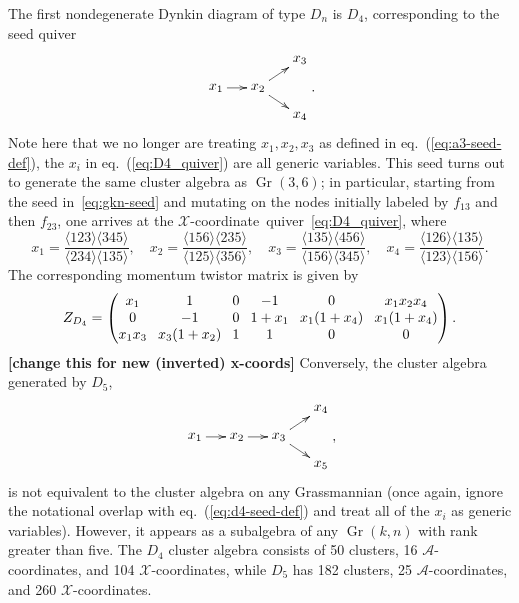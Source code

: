 \documentclass[11pt]{article}
\DeclareMathOperator{\Gr}{Gr}
\def\ket#1{\langle #1 \rangle}
\def\xcoord{$\mathcal{X}$-coordinate}
\def\xcoords{$\mathcal{X}$-coordinates}
\def\acoords{$\mathcal{A}$-coordinates}
\def\draftnote#1{{\bf [#1]}}
\begin{document}
The first nondegenerate Dynkin diagram of type $D_n$ is $D_4$, corresponding to the seed quiver
\begin{equation} \label{eq:D4_quiver}
    \begin{gathered}
    \begin{xy} 0;<1pt,0pt>:<0pt,-1pt>::
      (0,20) *+{x_1} ="1",
      (30,20) *+{x_2} ="2",
      (60,0) *+{x_3} ="3",
      (60,40) *+{x_4} ="4",
      "1", {\ar"2"},
      "2", {\ar"3"},
      "2", {\ar"4"},
    \end{xy}
    \end{gathered} .
\end{equation}
Note here that we no longer are treating $x_1, x_2, x_3$ as defined in eq.~(\ref{eq:a3-seed-def}), the $x_i$ in eq.~(\ref{eq:D4_quiver}) are all generic variables. This seed turns out to generate the same cluster algebra as $\Gr(3,6)$; in particular, starting from the seed in~\eqref{eq:gkn-seed} and mutating on the nodes initially labeled by $f_{13}$ and then $f_{23}$, one arrives at the \xcoord\ quiver~\eqref{eq:D4_quiver}, where
\begin{equation}\label{eq:d4-seed-def}
x_1 = \frac{\ket{123}\ket{345}}{\ket{234}\ket{135}}, \quad x_2 = \frac{\ket{156}\ket{235}}{\ket{125}\ket{356}}, \quad x_3 = \frac{\ket{135}\ket{456}}{\ket{156}\ket{345}}, \quad x_4 = \frac{\ket{126}\ket{135}}{\ket{123}\ket{156}}.
\end{equation}
The corresponding momentum twistor matrix is given by
\begin{equation}
Z_{D_4} = 
\begingroup
\setlength\arraycolsep{4pt}
\begin{pmatrix} 
 x_1 & 1 & 0 & -1 & 0 & x_1 x_2 x_4 \\
 0 & -1 & 0 & 1+x_1 & x_1 (1+x_4) & x_1 (1+x_4) \\
 x_1 x_3 & x_3 (1+x_2)  & 1 & 1 & 0 & 0
 \end{pmatrix}
\endgroup .
\end{equation}
\draftnote{change this for new (inverted) x-coords}
Conversely, the cluster algebra generated by $D_5$,
\begin{equation}\label{def:D5}
    \begin{gathered}
    \begin{xy} 0;<1pt,0pt>:<0pt,-1pt>::
      (0,20) *+{x_1} ="1",
      (30,20) *+{x_2} ="2",
      (60,20) *+{x_3} ="3",
      (90,0) *+{x_4} ="4",
      (90,40) *+{x_5} ="5",
      "1", {\ar"2"},
      "2", {\ar"3"},
      "3", {\ar"4"},
      "3", {\ar"5"},
    \end{xy}
    \end{gathered} ,
\end{equation}
is not equivalent to the cluster algebra on any Grassmannian (once again, ignore the notational overlap with eq.~(\ref{eq:d4-seed-def}) and treat all of the $x_i$ as generic variables). However, it appears as a subalgebra of any $\Gr(k,n)$ with rank greater than five. The $D_4$ cluster algebra consists of 50 clusters, 16 \acoords, and 104 \xcoords, while $D_5$ has 182 clusters, 25 \acoords, and 260 \xcoords. 
\end{document}
